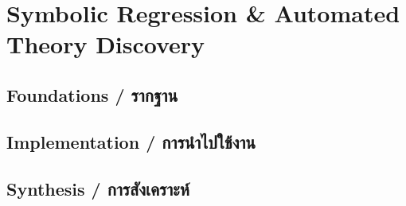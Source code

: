 \chapter{Symbolic Regression \& Automated Theory Discovery}
\label{ch:symbolic_regression}

\section{Foundations \quad / \quad \textthai{รากฐาน}}



\section{Implementation \quad / \quad \textthai{การนำไปใช้งาน}}



\section{Synthesis \quad / \quad \textthai{การสังเคราะห์}}



